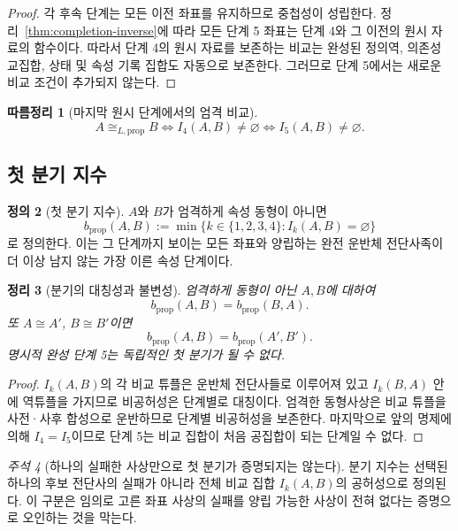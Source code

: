 \documentclass[11pt]{article}
\newtheorem{theorem}{정리}[section]
\newtheorem{corollary}[theorem]{따름정리}
\theoremstyle{definition}
\newtheorem{definition}[theorem]{정의}
\theoremstyle{remark}
\newtheorem{remark}[theorem]{주석}
\begin{document}
\begin{proof}
각 후속 단계는 모든 이전 좌표를 유지하므로 중첩성이 성립한다.
정리~\ref{thm:completion-inverse}에 따라 모든 단계 5 좌표는 단계 4와 그 이전의 원시 자료의 함수이다.
따라서 단계 4의 원시 자료를 보존하는 비교는 완성된 정의역, 의존성 교집합, 상태 및 속성 기록 집합도 자동으로 보존한다.
그러므로 단계 5에서는 새로운 비교 조건이 추가되지 않는다.
\end{proof}

\begin{corollary}[마지막 원시 단계에서의 엄격 비교]
\[
A\cong_{L,\mathrm{prop}}B
\Longleftrightarrow
I_4(A,B)\neq\varnothing
\Longleftrightarrow
I_5(A,B)\neq\varnothing.
\]
\end{corollary}

\subsection{첫 분기 지수}

\begin{definition}[첫 분기 지수]
\(A\)와 \(B\)가 엄격하게 속성 동형이 아니면
\[
b_{\mathrm{prop}}(A,B):=
\min\{k\in\{1,2,3,4\}:I_k(A,B)=\varnothing\}
\]
로 정의한다.
이는 그 단계까지 보이는 모든 좌표와 양립하는 완전 운반체 전단사족이 더 이상 남지 않는 가장 이른 속성 단계이다.
\end{definition}

\begin{theorem}[분기의 대칭성과 불변성]
\label{thm:branching-invariance}
엄격하게 동형이 아닌 \(A,B\)에 대하여
\[
b_{\mathrm{prop}}(A,B)=b_{\mathrm{prop}}(B,A).
\]
또 \(A\cong A'\), \(B\cong B'\)이면
\[
b_{\mathrm{prop}}(A,B)=b_{\mathrm{prop}}(A',B').
\]
명시적 완성 단계 5는 독립적인 첫 분기가 될 수 없다.
\end{theorem}

\begin{proof}
\(I_k(A,B)\)의 각 비교 튜플은 운반체 전단사들로 이루어져 있고 \(I_k(B,A)\) 안에 역튜플을 가지므로 비공허성은 단계별로 대칭이다.
엄격한 동형사상은 비교 튜플을 사전·사후 합성으로 운반하므로 단계별 비공허성을 보존한다.
마지막으로 앞의 명제에 의해 \(I_4=I_5\)이므로 단계 5는 비교 집합이 처음 공집합이 되는 단계일 수 없다.
\end{proof}

\begin{remark}[하나의 실패한 사상만으로 첫 분기가 증명되지는 않는다]
분기 지수는 선택된 하나의 후보 전단사의 실패가 아니라 전체 비교 집합 \(I_k(A,B)\)의 공허성으로 정의된다.
이 구분은 임의로 고른 좌표 사상의 실패를 양립 가능한 사상이 전혀 없다는 증명으로 오인하는 것을 막는다.
\end{remark}
\end{document}
